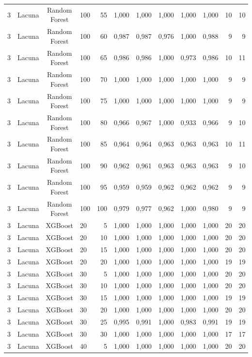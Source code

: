 \begin{longtable}{ccclrrrrrrrr}
3 & Lacuna & Random Forest & 100 & 55 & 1,000 & 1,000 & 1,000 & 1,000 & 1,000 & 10 & 10 \\
3 & Lacuna & Random Forest & 100 & 60 & 0,987 & 0,987 & 0,976 & 1,000 & 0,988 & 9 & 9 \\
3 & Lacuna & Random Forest & 100 & 65 & 0,986 & 0,986 & 1,000 & 0,973 & 0,986 & 10 & 11 \\
3 & Lacuna & Random Forest & 100 & 70 & 1,000 & 1,000 & 1,000 & 1,000 & 1,000 & 9 & 9 \\
3 & Lacuna & Random Forest & 100 & 75 & 1,000 & 1,000 & 1,000 & 1,000 & 1,000 & 9 & 9 \\
3 & Lacuna & Random Forest & 100 & 80 & 0,966 & 0,967 & 1,000 & 0,933 & 0,966 & 9 & 10 \\
3 & Lacuna & Random Forest & 100 & 85 & 0,964 & 0,964 & 0,963 & 0,963 & 0,963 & 10 & 11 \\
3 & Lacuna & Random Forest & 100 & 90 & 0,962 & 0,961 & 0,963 & 0,963 & 0,963 & 9 & 10 \\
3 & Lacuna & Random Forest & 100 & 95 & 0,959 & 0,959 & 0,962 & 0,962 & 0,962 & 9 & 9 \\
3 & Lacuna & Random Forest & 100 & 100 & 0,979 & 0,977 & 0,962 & 1,000 & 0,980 & 9 & 9 \\
3 & Lacuna & XGBoost & 20 & 5 & 1,000 & 1,000 & 1,000 & 1,000 & 1,000 & 20 & 20 \\
3 & Lacuna & XGBoost & 20 & 10 & 1,000 & 1,000 & 1,000 & 1,000 & 1,000 & 20 & 20 \\
3 & Lacuna & XGBoost & 20 & 15 & 1,000 & 1,000 & 1,000 & 1,000 & 1,000 & 20 & 20 \\
3 & Lacuna & XGBoost & 20 & 20 & 1,000 & 1,000 & 1,000 & 1,000 & 1,000 & 19 & 19 \\
3 & Lacuna & XGBoost & 30 & 5 & 1,000 & 1,000 & 1,000 & 1,000 & 1,000 & 20 & 20 \\
3 & Lacuna & XGBoost & 30 & 10 & 1,000 & 1,000 & 1,000 & 1,000 & 1,000 & 20 & 20 \\
3 & Lacuna & XGBoost & 30 & 15 & 1,000 & 1,000 & 1,000 & 1,000 & 1,000 & 19 & 19 \\
3 & Lacuna & XGBoost & 30 & 20 & 1,000 & 1,000 & 1,000 & 1,000 & 1,000 & 20 & 20 \\
3 & Lacuna & XGBoost & 30 & 25 & 0,995 & 0,991 & 1,000 & 0,983 & 0,991 & 19 & 19 \\
3 & Lacuna & XGBoost & 30 & 30 & 1,000 & 1,000 & 1,000 & 1,000 & 1,000 & 17 & 17 \\
3 & Lacuna & XGBoost & 40 & 5 & 1,000 & 1,000 & 1,000 & 1,000 & 1,000 & 20 & 20 \\

\end{longtable}
